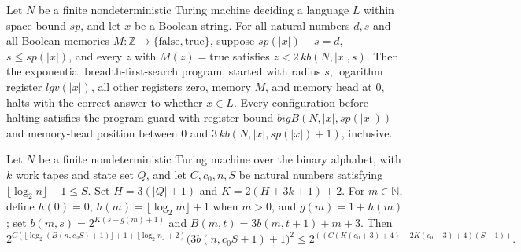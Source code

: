 \begin{theorem}
Let $N$ be a finite nondeterministic Turing machine deciding a language $L$ within space
bound $sp$, and let $x$ be a Boolean string. For all natural numbers $d,s$ and all
Boolean memories $M:\mathbb{Z}\to\{\mathrm{false},\mathrm{true}\}$, suppose
$sp(|x|)-s=d$, $s\le sp(|x|)$, and every $z$ with $M(z)=\mathrm{true}$ satisfies
$z<2\,kb(N,|x|,s)$. Then the exponential breadth-first-search program, started with
radius $s$, logarithm register $lgv(|x|)$, all other registers zero, memory $M$, and
memory head at $0$, halts with the correct answer to whether $x\in L$. Every
configuration before halting satisfies the program guard with register bound
$bigB(N,|x|,sp(|x|))$ and memory-head position between $0$ and $3\,kb(N,|x|,sp(|x|)+1)$,
inclusive.
\end{theorem}

\begin{lemma}
\label{Complexity.time_bound}
\leanok
{}
Let $N$ be a finite nondeterministic Turing machine over the binary alphabet, with $k$
work tapes and state set $Q$, and let $C,c_0,n,S$ be natural numbers satisfying
$\lfloor\log_2 n\rfloor+1\le S$. Set $H=3(|Q|+1)$ and $K=2(H+3k+1)+2$. For $m\in\mathbb
N$, define $h(0)=0$, $h(m)=\lfloor\log_2 m\rfloor+1$ when $m>0$, and $g(m)=1+h(m)$; set
$b(m,s)=2^{K(s+g(m)+1)}$ and $B(m,t)=3b(m,t+1)+m+3$. Then
\[
2^{C(\lfloor\log_2(B(n,c_0S)+1)\rfloor+1+\lfloor\log_2
n\rfloor+2)}\bigl(3b(n,c_0S+1)+1\bigr)^2
\le 2^{\left((C(K(c_0+3)+4)+2K(c_0+3)+4)(S+1)\right)}.
\]
\end{lemma}

